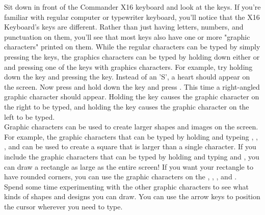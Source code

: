 Sit down in front of the Commander X16 keyboard and look at the keys.  If
you're familiar with regular computer or typewriter keyboard, you'll notice
that the X16 Keyboard's keys are different.  Rather than just having letters,
numbers, and punctuation on them, you'll see that most keys also have one or
more "graphic characters" printed on them.  While the regular characters can be
typed by simply pressing the keys, the graphics characters can be typed by
holding down either \shiftkey or \altkey and pressing one of the keys with
graphics characters.  For example, try holding down the \shiftkey key and
pressing the  key.  Instead of an 'S', a heart
should appear on the screen.  Now press and hold down the \altkey key and press
.  This time a right-angled graphic character should appear.  Holding
the \shiftkey key causes the graphic character on the right to be typed, and
holding the \altkey key causes the graphic character on the left to be typed.\\

Graphic characters can be used to create larger shapes and images on the
screen.  For example, the graphic characters that can be typed by holding
\altkey and typeing , , , and  can be used to
create a square that is larger than a single character.  If you include the
graphic characters that can be typed by holding \shiftkey and typing 
and , you can draw a rectangle as large as the entire screen!  If you
want your rectangle to have rounded corners, you can use the graphic characters
on the , , , and .\\

Spend some time experimenting with the other graphic characters to see what
kinds of shapes and designs you can draw.  You can use the arrow keys to
position the cursor wherever you need to type.\\

% 
% 



